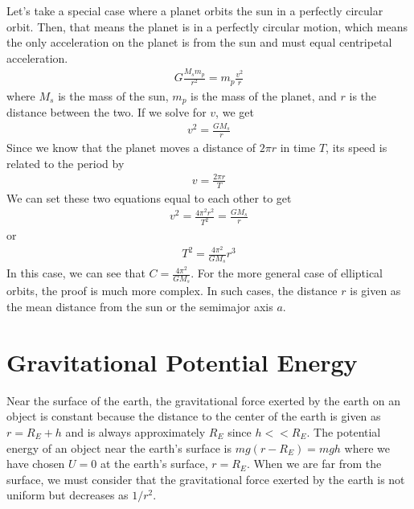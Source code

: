 \documentclass[11pt]{article}
\begin{document}
Let's take a special case where a planet orbits the sun in a perfectly circular orbit. Then, that means the planet is in a perfectly circular motion, which means the only acceleration on the planet is from the sun and must equal centripetal acceleration. 
\begin{align*}
    G\frac{M_s m_p}{r^2} = m_p \frac{v^2}{r}
\end{align*}
where $M_s$ is the mass of the sun, $m_p$ is the mass of the planet, and $r$ is the distance between the two. If we solve for $v$, we get
\begin{align*}
    v^2 = \frac{GM_s}{r}
\end{align*}
Since we know that the planet moves a distance of $2\pi r$ in time $T$, its speed is related to the period by
\begin{align*}
    v = \frac{2\pi r}{T}
\end{align*}
We can set these two equations equal to each other to get
\begin{align*}
    v^2 = \frac{4\pi^2 r^2}{T^2} = \frac{GM_s}{r}
\end{align*}
or
\begin{align*}
    T^2 = \frac{4\pi^2}{GM_s}r^3
\end{align*}
In this case, we can see that $C = \frac{4\pi^2}{GM_s}$. For the more general case of elliptical orbits, the proof is much more complex. In such cases, the distance $r$ is given as the mean distance from the sun or the semimajor axis $a$.

\section{Gravitational Potential Energy}

Near the surface of the earth, the gravitational force exerted by the earth on an object is constant because the distance to the center of the earth is given as $r = R_E + h$ and is always approximately $R_E$ since $ h << R_E$. The potential energy of an object near the earth's surface is $mg(r - R_E) = mgh$ where we have chosen $U = 0$ at the earth's surface, $r = R_E$. When we are far from the surface, we must consider that the gravitational force exerted by the earth is not uniform but decreases as $1/r^2$. 
\end{document}

